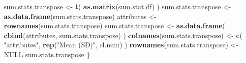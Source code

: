 \documentclass[]{article}
\newenvironment{Shaded}{\begin{snugshade}}{\end{snugshade}}
\newcommand{\KeywordTok}[1]{\textcolor[rgb]{0.13,0.29,0.53}{\textbf{#1}}}
\newcommand{\StringTok}[1]{\textcolor[rgb]{0.31,0.60,0.02}{#1}}
\newcommand{\OtherTok}[1]{\textcolor[rgb]{0.56,0.35,0.01}{#1}}
\newcommand{\NormalTok}[1]{#1}
\begin{document}
\begin{Shaded}
\begin{Highlighting}[]
\NormalTok{  sum.stats.transpose <-}\StringTok{ }\KeywordTok{t}\NormalTok{( }\KeywordTok{as.matrix}\NormalTok{(sum.stat.df) )}
\NormalTok{  sum.stats.transpose <-}\StringTok{ }\KeywordTok{as.data.frame}\NormalTok{(sum.stats.transpose)}
\NormalTok{  attributes <-}\StringTok{ }\KeywordTok{rownames}\NormalTok{(sum.stats.transpose)}
\NormalTok{  sum.stats.transpose <-}\StringTok{ }\KeywordTok{as.data.frame}\NormalTok{( }\KeywordTok{cbind}\NormalTok{(attributes, sum.stats.transpose) )}
  \KeywordTok{colnames}\NormalTok{(sum.stats.transpose) <-}\StringTok{ }\KeywordTok{c}\NormalTok{( }\StringTok{"attributes"}\NormalTok{, }\KeywordTok{rep}\NormalTok{(}\StringTok{"Mean (SD)"}\NormalTok{, cl.num) )}
  \KeywordTok{rownames}\NormalTok{(sum.stats.transpose) <-}\StringTok{ }\OtherTok{NULL}
\NormalTok{  sum.stats.transpose}
\NormalTok{\}}
\end{Highlighting}
\end{Shaded}
\end{document}
